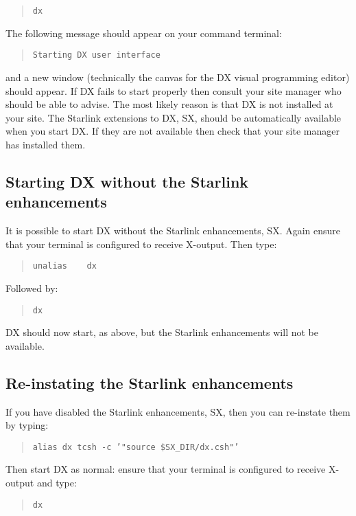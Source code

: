 \begin{quote}
{\tt dx}
\end{quote}

The following message should appear on your command terminal:

\begin{quote}
{\tt Starting DX user interface}
\end{quote}

and a new window (technically the canvas for the DX visual programming
editor) should appear. If DX fails to start properly then consult your
site manager who should be able to advise. The most likely reason is
that DX is not installed at your site. The Starlink extensions to DX,
SX, should be automatically available when you start DX.  If they
are not available then check that your site manager has installed them.

\newpage
\subsection{Starting DX without the Starlink enhancements}

It is possible to start DX without the Starlink enhancements, SX. Again
ensure that your terminal is configured to receive X-output. Then
type:

\begin{quote}
{\tt unalias ~~ dx}
\end{quote}

Followed by:

\begin{quote}
{\tt dx}
\end{quote}

DX should now start, as above, but the Starlink enhancements will not
be available.

\subsection{Re-instating the Starlink enhancements}

If you have disabled the Starlink enhancements, SX, then you can
re-instate them by typing:

\begin{quote}
{\tt alias dx tcsh -c '"source \$SX\_DIR/dx.csh"'}
\end{quote}

Then start DX as normal: ensure that your terminal is configured to
receive X-output and type:

\begin{quote}
{\tt dx}
\end{quote}

